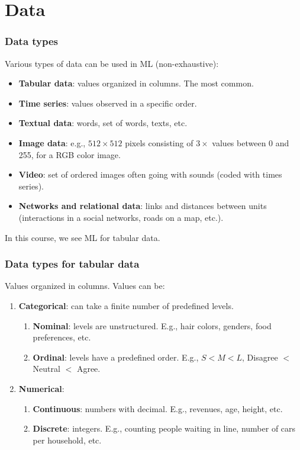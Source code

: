 \section{Data}
\begin{frame}
\frametitle{Data types}
Various types of data can be used in ML (non-exhaustive):
\begin{itemize}
\item {\bf Tabular data}: values organized in columns. The most common.
\item {\bf Time series}: values observed in a specific order.
\item {\bf Textual data}: words, set of words, texts, etc.
\item {\bf Image data}: e.g., $512\times 512$ pixels consisting of $3 \times$ values between 0 and 255, for a RGB color image. 
\item {\bf Video}: set of ordered images often going with sounds (coded with times series).
\item {\bf Networks and relational data}: links and distances between units (interactions in a social networks, roads on a map, etc.).
\end{itemize}
In this course, we see ML for tabular data.
\end{frame}
\begin{frame}
\frametitle{Data types for tabular data}
Values organized in columns. Values can be:
\begin{enumerate}
\item {\bf Categorical}: can take a finite number of predefined levels.
\begin{enumerate}
\item {\bf Nominal}: levels are unstructured. E.g., hair colors, genders, food preferences, etc.
\item {\bf Ordinal}: levels have a predefined order. E.g., $S<M<L$, Disagree $<$ Neutral $<$ Agree.
\end{enumerate} 
\item {\bf Numerical}: 
\begin{enumerate}
\item {\bf Continuous}: numbers with decimal. E.g., revenues, age, height, etc.
\item {\bf Discrete}: integers. E.g., counting people waiting in line, number of cars per household, etc. 
\end{enumerate}
\end{enumerate}
\end{frame}

